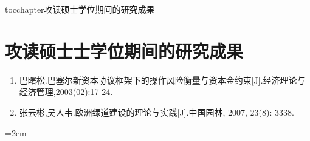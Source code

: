 
\newenvironment{thepublications}{\wuhao\song}

\addcontentsline{toc}{chapter}{攻读硕士学位期间的研究成果}%
\chapter*{\centering\xiaosan\song\bfseries 攻读硕士士学位期间的研究成果}

\begin{thepublications}

\setlength{\parindent}{0em}
\begin{enumerate}
	\item 巴曙松.巴塞尔新资本协议框架下的操作风险衡量与资本金约束[J].经济理论与经济管理,2003(02):17-24.
	\item 张云彬,吴人韦.欧洲绿道建设的理论与实践[J].中国园林, 2007, 23(8): 33­38.
\end{enumerate}

\vfill
{}\hangindent=2em\noindent

\setlength{\parindent}{2em}

\end{thepublications}

